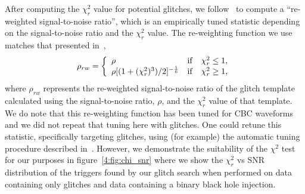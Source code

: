 After computing the $\chi_{r}^{2}$ value for potential \scl{} glitches, we follow~\cite{rw_snr_eq:2012} to compute a ``re-weighted signal-to-noise ratio'', which is an empirically tuned statistic depending on the signal-to-noise ratio and the $\chi_{r}^{2}$ value.  The re-weighting function we use matches that presented in~\cite{rw_snr_eq:2012},
%
\begin{equation}
\rho_{rw} =  \left\{  \begin{array}{l@{\quad}cr} 
\rho & \mathrm{if} & \chi_{r}^{2} \leq 1, \\  
\rho [(1 + (\chi_{r}^{2})^3)/2]^{-\frac{1}{6}} &  \mathrm{if} & \chi_{r}^{2} \ge 1,   
\end{array}\right.
\label{4:eqn:reweighting}
\end{equation}
%
where $\rho_{rw}$ represents the re-weighted signal-to-noise ratio of the \scl{} glitch template calculated using the signal-to-noise ratio, $\rho$, and the $\chi_{r}^{2}$ value of that template.
We do note that this re-weighting function has been tuned for CBC waveforms and we did not repeat that tuning here with \scl{} glitches. One could retune this statistic, specifically targeting \scl{} glitches, using (for example) the automatic tuning procedure described in~\cite{McIsaac_Chi:2022}. However, we demonstrate the suitability of the $\chi^{2}$ test for our purposes in figure~\ref{4:fig:chi_snr} where we show the $\chi_{r}^{2}$ vs SNR distribution of the triggers found by our \scl{} glitch search when performed on data containing only \scl{} glitches and data containing a binary black hole \gw{} injection.

